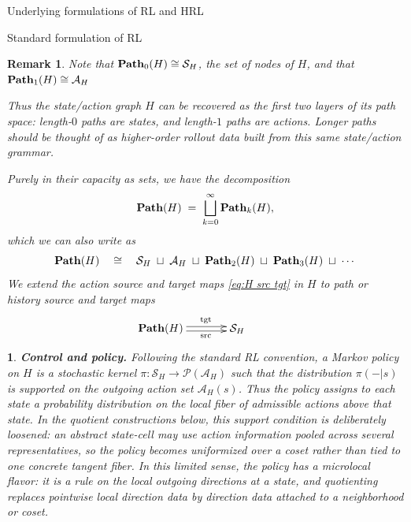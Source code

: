 \documentclass[11pt]{article}
\newtheorem{remark}[subsubsection]{Remark}
\newtheorem{ermark}[subsubsection]{}
\begin{document}
\begin{section}{Underlying formulations of RL and HRL}
\begin{subsection}{Standard formulation of RL}
\begin{remark}
Note that $\bold{Path}_{0}(H)\cong\mathcal{S}_{H}$, the set of nodes of $H$, and that $\bold{Path}_{1}(H)\cong\mathcal{A}_{H}$

Thus the state/action graph $H$ can be recovered as the first two layers of its path space: length-$0$ paths are states, and length-$1$ paths are actions. Longer paths should be thought of as higher-order rollout data built from this same state/action grammar.

Purely in their capacity as sets, we have the decomposition
$$
\bold{Path}(H)\;=\;\bigsqcup_{k=0}^{\infty}\bold{Path}_{k}(H),
$$
which we can also write as
$$
\bold{Path}(H)
\quad\cong\quad
\mathcal{S}_{H}\;\sqcup\;\mathcal{A}_{H}\;\sqcup\;\bold{Path}_{2}(H)\;\sqcup\;\bold{Path}_{3}(H)\;\sqcup\;\cdots
$$
We extend the action source and target maps \eqref{eq:H src tgt} in $H$ to {\em path} or {\em history source} and {\em target} maps
$$
\begin{xy}
(0,0)*+{\!\!\!\!\!\!\!\!\!\!\!\!\!\!\!\bold{Path}(H)}="1";
(20,0)*+{\mathcal{S}_{H}}="2";
{\ar@<2pt>^{\text{tgt}} "1"; "2"}
{\ar@<-2pt>_{\text{src}} "1"; "2"}
\end{xy}
$$
\end{remark}

\begin{ermark}
{\bf Control and policy.}
\normalfont
Following the standard RL convention, a Markov policy on $H$ is a stochastic kernel
$
\pi:\mathcal{S}_{H}\longrightarrow\mathcal{P}(\mathcal{A}_{H})
$
such that the distribution $\pi(-|s)$ is supported on the outgoing action set $\mathcal{A}_{H}(s)$. Thus the policy assigns to each state a probability distribution on the local fiber of admissible actions above that state. In the quotient constructions below, this support condition is deliberately loosened: an abstract state-cell may use action information pooled across several representatives, so the policy becomes uniformized over a coset rather than tied to one concrete tangent fiber. In this limited sense, the policy has a microlocal flavor: it is a rule on the local outgoing directions at a state, and quotienting replaces pointwise local direction data by direction data attached to a neighborhood or coset.


\end{ermark}
\end{subsection}
\end{section}
\end{document}

